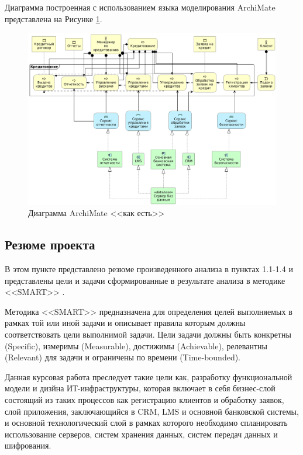 \documentclass[14pt, a4paper]{extarticle}
\begin{document}
Диаграмма построенная с использованием языка моделирования ArchiMate
представлена на Рисунке \ref{fig:as_is_archimate}.

\begin{figure}[H]
	\centering
	\includegraphics[width=\textwidth]{as-is-archimate.png}
	\caption{Диаграмма ArchiMate <<как есть>>}
	\label{fig:as_is_archimate}
\end{figure}

\subsection{Резюме проекта}

В этом пункте представлено резюме произведенного анализа в пунктах 1.1-1.4 и 
представлены цели и задачи сформированные в результате анализа в методике
<<SMART>> \cite{smart2.0}.

Методика <<SMART>> предназначена для определения целей выполняемых в рамках
той или иной задачи и описывает правила которым должны соответствовать цели
выполнимой задачи. Цели задачи должны быть конкретны (Specific), измеримы
(Measurable), достижимы (Achievable), релевантны (Relevant) для задачи и
ограничены по времени (Time-bounded). 

Данная курсовая работа преследует такие цели как, разработку функциональной
модели и дизйна ИТ-инфраструктуры, которая включает в себя бизнес-слой
состоящий из таких процессов как регистрацию клиентов и обработку заявок, слой
приложения, заключающийся в CRM, LMS и основной банковской системы, и основной
технологический слой в рамках которого необходимо спланировать использование
серверов, систем хранения данных, систем передач данных и шифрования.
\end{document}
